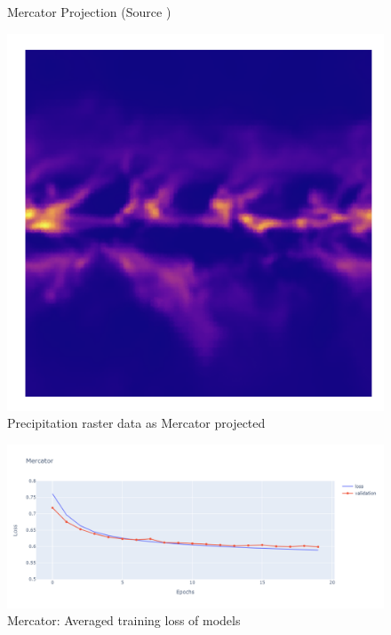 \begin{figure}[H]
\begin{minipage}{0.30\textwidth}
        \caption{Mercator Projection (Source \cite{PROJ_SITE})}
        \label{fig:merc_proj}
    \end{minipage}\hfill
    \begin{minipage}{0.30\textwidth}
        \centering
        \includegraphics[width=0.9\linewidth]{figures/chapter-8/prect_mercator.png}
        \caption{Precipitation raster data as Mercator projected}
        \label{fig:merc_prect_raster}
    \end{minipage}\hfill
\end{figure}

\begin{figure}[H]
    \centering
    \includegraphics[width=1.0\linewidth]{figures/chapter-8/merc_loss.png}
    \caption{Mercator: Averaged training loss of models  }
    \label{fig:merc_loss}
\end{figure}


